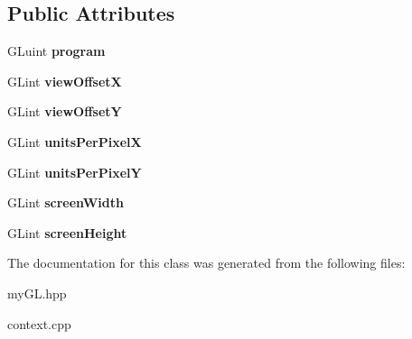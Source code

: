 \subsection*{Public Attributes}
\begin{DoxyCompactItemize}
\item 
\hypertarget{classShaderProgram_a5cd33e7bf1c9d23b2eef8aa93dc36558}{}G\+Luint {\bfseries program}\label{classShaderProgram_a5cd33e7bf1c9d23b2eef8aa93dc36558}

\item 
\hypertarget{classShaderProgram_ad9000af8292a5de7a33108ae6c775acd}{}G\+Lint {\bfseries view\+Offset\+X}\label{classShaderProgram_ad9000af8292a5de7a33108ae6c775acd}

\item 
\hypertarget{classShaderProgram_a5f68b35bbd45e69c2b53310cc5f6d73f}{}G\+Lint {\bfseries view\+Offset\+Y}\label{classShaderProgram_a5f68b35bbd45e69c2b53310cc5f6d73f}

\item 
\hypertarget{classShaderProgram_ab228e6feb1db07d20255c6bde5ed33a8}{}G\+Lint {\bfseries units\+Per\+Pixel\+X}\label{classShaderProgram_ab228e6feb1db07d20255c6bde5ed33a8}

\item 
\hypertarget{classShaderProgram_addaecff211bcb14fe9f254c31f407327}{}G\+Lint {\bfseries units\+Per\+Pixel\+Y}\label{classShaderProgram_addaecff211bcb14fe9f254c31f407327}

\item 
\hypertarget{classShaderProgram_ac9dc87f9ae304100c66a86f59c6ddc63}{}G\+Lint {\bfseries screen\+Width}\label{classShaderProgram_ac9dc87f9ae304100c66a86f59c6ddc63}

\item 
\hypertarget{classShaderProgram_adf3cf91290d9ccdc9a07a88dffaf8bcb}{}G\+Lint {\bfseries screen\+Height}\label{classShaderProgram_adf3cf91290d9ccdc9a07a88dffaf8bcb}

\end{DoxyCompactItemize}


The documentation for this class was generated from the following files\+:\begin{DoxyCompactItemize}
\item 
my\+G\+L.\+hpp\item 
context.\+cpp\end{DoxyCompactItemize}
